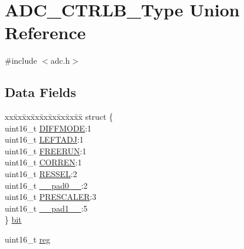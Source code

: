 \hypertarget{union_a_d_c___c_t_r_l_b___type}{}\section{A\+D\+C\+\_\+\+C\+T\+R\+L\+B\+\_\+\+Type Union Reference}
\label{union_a_d_c___c_t_r_l_b___type}


{\ttfamily \#include $<$adc.\+h$>$}

\subsection*{Data Fields}
\begin{DoxyCompactItemize}
\item 
\begin{tabbing}
xx\=xx\=xx\=xx\=xx\=xx\=xx\=xx\=xx\=\kill
struct \{\\
\>uint16\_t \mbox{\hyperlink{union_a_d_c___c_t_r_l_b___type_a0ec2f7d51df13147d6dbdbfc4620eb0c}{DIFFMODE}}:1\\
\>uint16\_t \mbox{\hyperlink{union_a_d_c___c_t_r_l_b___type_aca5a09873559dc78042c02b395ae6078}{LEFTADJ}}:1\\
\>uint16\_t \mbox{\hyperlink{union_a_d_c___c_t_r_l_b___type_a115e8308b9b99020d2b899cdd1f97908}{FREERUN}}:1\\
\>uint16\_t \mbox{\hyperlink{union_a_d_c___c_t_r_l_b___type_a94e3ef03cabd743cf9ccdc97fd52fa25}{CORREN}}:1\\
\>uint16\_t \mbox{\hyperlink{union_a_d_c___c_t_r_l_b___type_a7738480a2a6d6c68659c330c986a193b}{RESSEL}}:2\\
\>uint16\_t \mbox{\hyperlink{union_a_d_c___c_t_r_l_b___type_a77132c2c26a75f5b8751b235cda23828}{\_\_pad0\_\_}}:2\\
\>uint16\_t \mbox{\hyperlink{union_a_d_c___c_t_r_l_b___type_a30db59a1afd851a8a4acd5d8605ca6ba}{PRESCALER}}:3\\
\>uint16\_t \mbox{\hyperlink{union_a_d_c___c_t_r_l_b___type_ab72e3a1f2f7db8695c60c658f5a0f11a}{\_\_pad1\_\_}}:5\\
\} \mbox{\hyperlink{union_a_d_c___c_t_r_l_b___type_a8870a649a63dfce831382d1c57f48a33}{bit}}\\

\end{tabbing}\item 
uint16\+\_\+t \mbox{\hyperlink{union_a_d_c___c_t_r_l_b___type_a11760f5020019f4aa8cb02e694f7cc44}{reg}}
\end{DoxyCompactItemize}


